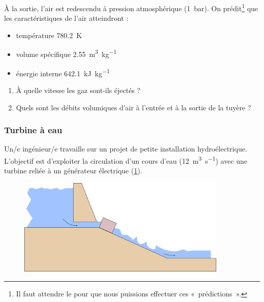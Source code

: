 	À la sortie, l’air est redescendu à pression atmosphérique (\SI{1}{\bar}). On prédit\footnote{Il faut attendre le \coursquatre pour que nous puissions effectuer ces «~prédictions~».} que les caractéristiques de l’air atteindront :
		
	\begin{itemize}
		\item température  				\tab \SI{780,2}{\kelvin}
		\item volume spécifique  		\tab \SI{2,55}{\metre\cubed\per\kilogram}
		\item énergie interne  			\tab \SI{642,1}{\kilo\joule\per\kilogram}
	\end{itemize}


	\begin{enumerate}
		\item À quelle vitesse les gaz sont-ils éjectés ?
		\item Quels sont les débits volumiques d’air à l’entrée et à la sortie de la tuyère ?
	\end{enumerate}
	

\subsubsection{Turbine à eau}
\label{exo_turbine_eau}

	Un/e ingénieur/e travaille sur un projet de petite installation hydroélectrique. L’objectif est d’exploiter la circulation d’un cours d’eau (\SI{12}{\metre\cubed\per\second}) avec une turbine reliée à un générateur électrique (\cref{fig_water_turbine_1}).
	
	\begin{figure}
		\begin{center}
			\includegraphics[width=10cm]{images/water_turbine_1.png}
		\end{center}
		\label{fig_water_turbine_1}
	\end{figure}
	
